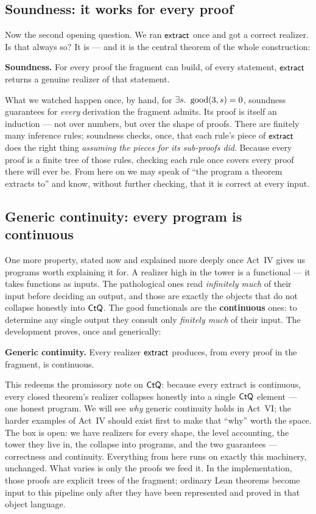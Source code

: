 \documentclass[11pt]{article}
\begin{document}
\subsection*{Soundness: it works for every proof}

Now the second opening question. We ran $\mathsf{extract}$ once and got a correct
realizer. Is that always so? It is --- and it is the central theorem of the
whole construction:
\begin{keystmt}
\textbf{Soundness.} For every proof the fragment can build, of every
statement, $\mathsf{extract}$ returns a genuine realizer of that statement.
\end{keystmt}
What we watched happen once, by hand, for $\exists s.\ \operatorname{good}(3,s)=0$,
soundness guarantees for \emph{every} derivation the fragment admits. Its
proof is itself an induction --- not over numbers, but over the shape of
proofs. There are finitely many inference rules; soundness checks, once, that
each rule's piece of $\mathsf{extract}$ does the right thing \emph{assuming the
pieces for its sub-proofs did}. Because every proof is a finite tree of those
rules, checking each rule once covers every proof there will ever be. From
here on we may speak of ``the program a theorem extracts to'' and know,
without further checking, that it is correct at every input.

\subsection*{Generic continuity: every program is continuous}

One more property, stated now and explained more deeply once Act~IV gives us
programs worth explaining it for. A realizer high in the tower is a
functional --- it takes functions as inputs. The pathological ones read
\emph{infinitely much} of their input before deciding an output, and those
are exactly the objects that do not collapse honestly into $\mathsf{CtQ}$. The good
functionals are the \textbf{continuous} ones: to determine any single output
they consult only \emph{finitely much} of their input. The development proves,
once and generically:
\begin{keystmt}
\textbf{Generic continuity.} Every realizer $\mathsf{extract}$ produces, from every
proof in the fragment, is continuous.
\end{keystmt}
This redeems the promissory note on $\mathsf{CtQ}$: because every extract is
continuous, every closed theorem's realizer collapses honestly into a single
$\mathsf{CtQ}$ element --- one honest program. We will see \emph{why} generic
continuity holds in Act~VI; the harder examples of Act~IV should exist first
to make that ``why'' worth the space. The box is open: we have realizers for
every shape, the level accounting, the tower they live in, the collapse into
programs, and the two guarantees --- correctness and continuity. Everything
from here runs on exactly this machinery, unchanged. What varies is only the
proofs we feed it. In the implementation, those proofs are explicit
 trees of the fragment; ordinary Lean theorems become input to
this pipeline only after they have been represented and proved in that object
language.
\end{document}
